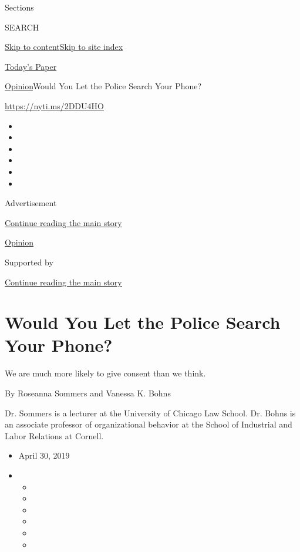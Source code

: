 Sections

SEARCH

\protect\hyperlink{site-content}{Skip to
content}\protect\hyperlink{site-index}{Skip to site index}

\href{https://myaccount.nytimes.com/auth/login?response_type=cookie\&client_id=vi}{}

\href{https://www.nytimes.com/section/todayspaper}{Today's Paper}

\href{/section/opinion}{Opinion}\textbar{}Would You Let the Police
Search Your Phone?

\url{https://nyti.ms/2DDU4HO}

\begin{itemize}
\item
\item
\item
\item
\item
\item
\end{itemize}

Advertisement

\protect\hyperlink{after-top}{Continue reading the main story}

\href{/section/opinion}{Opinion}

Supported by

\protect\hyperlink{after-sponsor}{Continue reading the main story}

\hypertarget{would-you-let-the-police-search-your-phone}{%
\section{Would You Let the Police Search Your
Phone?}\label{would-you-let-the-police-search-your-phone}}

We are much more likely to give consent than we think.

By Roseanna Sommers and Vanessa K. Bohns

Dr. Sommers is a lecturer at the University of Chicago Law School. Dr.
Bohns is an associate professor of organizational behavior at the School
of Industrial and Labor Relations at Cornell.

\begin{itemize}
\item
  April 30, 2019
\item
  \begin{itemize}
  \item
  \item
  \item
  \item
  \item
  \item
  \end{itemize}
\end{itemize}

